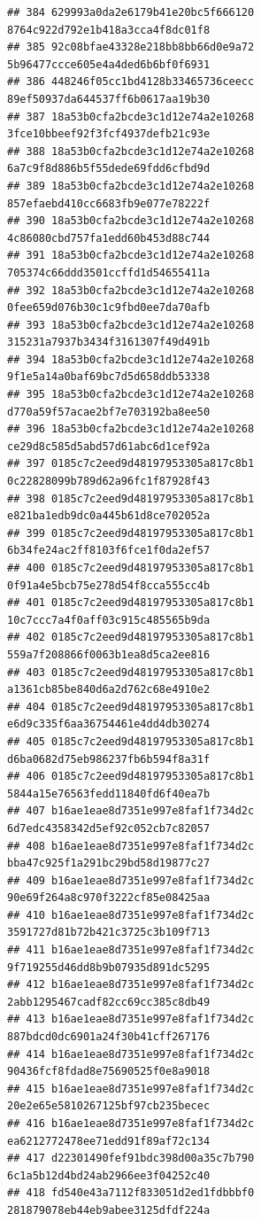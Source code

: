 \documentclass[]{article}
\begin{document}
\begin{verbatim}
## 384 629993a0da2e6179b41e20bc5f666120   8764c922d792e1b418a3cca4f8dc01f8
## 385 92c08bfae43328e218bb8bb66d0e9a72   5b96477ccce605e4a4ded6b6bf0f6931
## 386 448246f05cc1bd4128b33465736ceecc   89ef50937da644537ff6b0617aa19b30
## 387 18a53b0cfa2bcde3c1d12e74a2e10268   3fce10bbeef92f3fcf4937defb21c93e
## 388 18a53b0cfa2bcde3c1d12e74a2e10268   6a7c9f8d886b5f55dede69fdd6cfbd9d
## 389 18a53b0cfa2bcde3c1d12e74a2e10268   857efaebd410cc6683fb9e077e78222f
## 390 18a53b0cfa2bcde3c1d12e74a2e10268   4c86080cbd757fa1edd60b453d88c744
## 391 18a53b0cfa2bcde3c1d12e74a2e10268   705374c66ddd3501ccffd1d54655411a
## 392 18a53b0cfa2bcde3c1d12e74a2e10268   0fee659d076b30c1c9fbd0ee7da70afb
## 393 18a53b0cfa2bcde3c1d12e74a2e10268   315231a7937b3434f3161307f49d491b
## 394 18a53b0cfa2bcde3c1d12e74a2e10268   9f1e5a14a0baf69bc7d5d658ddb53338
## 395 18a53b0cfa2bcde3c1d12e74a2e10268   d770a59f57acae2bf7e703192ba8ee50
## 396 18a53b0cfa2bcde3c1d12e74a2e10268   ce29d8c585d5abd57d61abc6d1cef92a
## 397 0185c7c2eed9d48197953305a817c8b1   0c22828099b789d62a96fc1f87928f43
## 398 0185c7c2eed9d48197953305a817c8b1   e821ba1edb9dc0a445b61d8ce702052a
## 399 0185c7c2eed9d48197953305a817c8b1   6b34fe24ac2ff8103f6fce1f0da2ef57
## 400 0185c7c2eed9d48197953305a817c8b1   0f91a4e5bcb75e278d54f8cca555cc4b
## 401 0185c7c2eed9d48197953305a817c8b1   10c7ccc7a4f0aff03c915c485565b9da
## 402 0185c7c2eed9d48197953305a817c8b1   559a7f208866f0063b1ea8d5ca2ee816
## 403 0185c7c2eed9d48197953305a817c8b1   a1361cb85be840d6a2d762c68e4910e2
## 404 0185c7c2eed9d48197953305a817c8b1   e6d9c335f6aa36754461e4dd4db30274
## 405 0185c7c2eed9d48197953305a817c8b1   d6ba0682d75eb986237fb6b594f8a31f
## 406 0185c7c2eed9d48197953305a817c8b1   5844a15e76563fedd11840fd6f40ea7b
## 407 b16ae1eae8d7351e997e8faf1f734d2c   6d7edc4358342d5ef92c052cb7c82057
## 408 b16ae1eae8d7351e997e8faf1f734d2c   bba47c925f1a291bc29bd58d19877c27
## 409 b16ae1eae8d7351e997e8faf1f734d2c   90e69f264a8c970f3222cf85e08425aa
## 410 b16ae1eae8d7351e997e8faf1f734d2c   3591727d81b72b421c3725c3b109f713
## 411 b16ae1eae8d7351e997e8faf1f734d2c   9f719255d46dd8b9b07935d891dc5295
## 412 b16ae1eae8d7351e997e8faf1f734d2c   2abb1295467cadf82cc69cc385c8db49
## 413 b16ae1eae8d7351e997e8faf1f734d2c   887bdcd0dc6901a24f30b41cff267176
## 414 b16ae1eae8d7351e997e8faf1f734d2c   90436fcf8fdad8e75690525f0e8a9018
## 415 b16ae1eae8d7351e997e8faf1f734d2c   20e2e65e5810267125bf97cb235becec
## 416 b16ae1eae8d7351e997e8faf1f734d2c   ea6212772478ee71edd91f89af72c134
## 417 d22301490fef91bdc398d00a35c7b790   6c1a5b12d4bd24ab2966ee3f04252c40
## 418 fd540e43a7112f833051d2ed1fdbbbf0   281879078eb44eb9abee3125dfdf224a

\end{verbatim}
\end{document}
